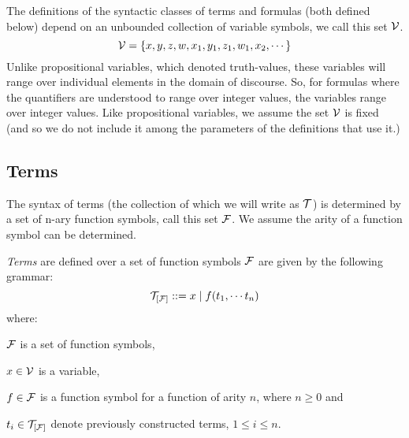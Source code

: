 \documentclass[11pt]{article}
\begin{document}
The definitions of the syntactic classes of terms and formulas (both
defined below) depend on an unbounded collection of variable symbols,
we call this set ${\cal{V}}$. 
\[{\cal{V}} = \{x,y,z,w,x_1,y_1,z_1,w_1,x_2,\cdots\}\] Unlike propositional
variables, which denoted truth-values, these variables will range over
individual elements in the domain of discourse. So, for formulas where the
quantifiers are understood to range over integer values, the variables range
over integer values.  Like propositional variables, we assume the set
${\cal{V}}$ is fixed (and so we do not include it among the parameters of the
definitions that use it.)

\subsection{Terms}
The syntax of terms (the collection of which we will write as
${\cal{T}}$) is determined by a set of n-ary function symbols, call
this set ${\cal{F}}$.  We assume the arity of a function symbol can be
determined.

\begin{definition}[Terms]

{\em{Terms}} are  defined over a set of function symbols
${\cal{F}}$ are given by the following grammar:
\[{\cal{T}}_{[{\cal{F}}]} ::= x \;|\; f(t_1,\cdots t_n)\]
where: \vspace{-.06125in}

\begin{description}
\item{{\hspace{.25in}}${\cal{F}}$} is a set of function symbols, \vspace{-.75em}
\item{{\hspace{.25in}}$x\in{\cal{V}}$} is a variable, \vspace{-.75em}
\item{{\hspace{.25in}}$f\in{\cal{F}}$} is a function symbol for a function of arity $n$, where $n \ge 0$ and 
\vspace{-.75em}
\item{{\hspace{.25in}}$t_i\in{\cal{T}}_{[{\cal{F}}]}$}  denote previously constructed terms, $1\le{}i\le{}n$.
\end{description}

\end{definition}
\end{document}
